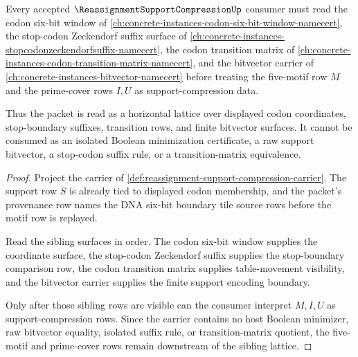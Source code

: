 \begin{theorem}
\label{thm:reassignment-support-compression-sibling-lattice}
Every accepted $\ReassignmentSupportCompressionUp$ consumer must read the codon six-bit window of \autoref{ch:concrete-instances-codon-six-bit-window-namecert}, the stop-codon Zeckendorf suffix surface of \autoref{ch:concrete-instances-stopcodonzeckendorfsuffix-namecert}, the codon transition matrix of \autoref{ch:concrete-instances-codon-transition-matrix-namecert}, and the bitvector carrier of \autoref{ch:concrete-instances-bitvector-namecert} before treating the five-motif row $M$ and the prime-cover rows $I,U$ as support-compression data.

Thus the packet is read as a horizontal lattice over displayed codon coordinates, stop-boundary suffixes, transition rows, and finite bitvector surfaces. It cannot be consumed as an isolated Boolean minimization certificate, a raw support bitvector, a stop-codon suffix rule, or a transition-matrix equivalence.
\end{theorem}
\begin{proof}
Project the carrier of \autoref{def:reassignment-support-compression-carrier}. The support row $S$ is already tied to displayed codon membership, and the packet's provenance row names the DNA six-bit boundary tile source rows before the motif row is replayed.

Read the sibling surfaces in order. The codon six-bit window supplies the coordinate surface, the stop-codon Zeckendorf suffix supplies the stop-boundary comparison row, the codon transition matrix supplies table-movement visibility, and the bitvector carrier supplies the finite support encoding boundary.

Only after those sibling rows are visible can the consumer interpret $M,I,U$ as support-compression rows. Since the carrier contains no host Boolean minimizer, raw bitvector equality, isolated suffix rule, or transition-matrix quotient, the five-motif and prime-cover rows remain downstream of the sibling lattice.
\end{proof}


